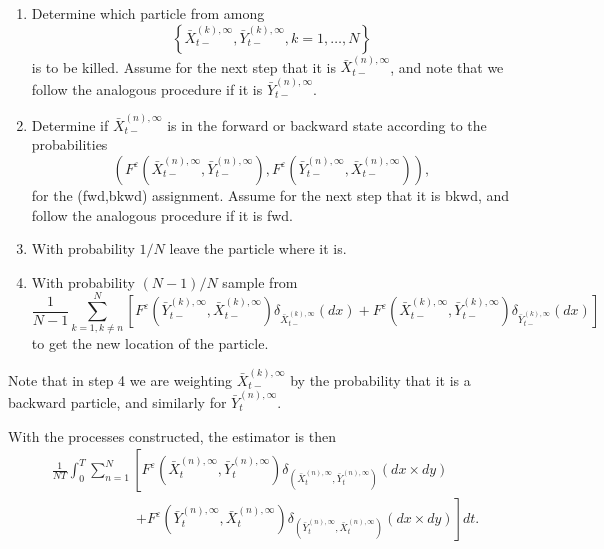 \documentclass[english,11pt]{article}%
\numberwithin{equation}{section}
\numberwithin{example}{section}
\numberwithin{theorem}{section}
\begin{document}
\begin{enumerate}
\item Determine which particle from among
\[
\left\{  \bar{X}_{t-}^{(k),\infty},\bar{Y}_{t-}^{(k),\infty},k=1,\ldots
,N\right\}
\]
is to be killed. Assume for the next step that it is $\bar{X}_{t-}%
^{(n),\infty}$, and note that we follow the analogous procedure if it is
$\bar{Y}_{t-}^{(n),\infty}$.

\item Determine if $\bar{X}_{t-}^{(n),\infty}$ is in the forward or backward
state according to the probabilities
\[
(F^{\varepsilon}(\bar{X}_{t-}^{(n),\infty},\bar{Y}_{t-}^{(n),\infty
}),F^{\varepsilon}(\bar{Y}_{t-}^{(n),\infty},\bar{X}_{t-}^{(n),\infty})),
\]
for the (fwd,bkwd) assignment. Assume for the next step that it is bkwd, and
follow the analogous procedure if it is fwd.

\item With probability $1/N$ leave the particle where it is.

\item With probability $(N-1)/N$ sample from
\[
\frac{1}{N-1}\sum_{k=1,k\neq n}^{N}\left[  F^{\varepsilon}(\bar{Y}%
_{t-}^{(k),\infty},\bar{X}_{t-}^{(k),\infty})\delta_{\bar{X}_{t-}^{(k),\infty
}}(dx)+F^{\varepsilon}(\bar{X}_{t-}^{(k),\infty},\bar{Y}_{t-}^{(k),\infty
})\delta_{\bar{Y}_{t-}^{(k),\infty}}(dx)\right]
\]
to get the new location of the particle.
\end{enumerate}

Note that in step 4 we are weighting $\bar{X}_{t-}^{(k),\infty}$ by the
probability that it is a backward particle, and similarly for $\bar{Y}%
_{t}^{(n),\infty}$.

With the processes constructed, the estimator is then%
\begin{align*}
&  \frac{1}{NT}\int_{0}^{T} \sum_{n=1}^{N} \left[  F^{\varepsilon}(\bar{X}%
_{t}^{(n),\infty},\bar{Y}_{t}^{(n),\infty})\delta_{(\bar{X}_{t}^{(n),\infty
},\bar{Y}_{t}^{(n),\infty})}(dx\times dy) \right. \\
&  \mbox{} \qquad\qquad\qquad\left.  +F^{\varepsilon}(\bar{Y}_{t}^{(n),\infty
},\bar{X}_{t}^{(n),\infty})\delta_{(\bar{Y}_{t}^{(n),\infty},\bar{X}%
_{t}^{(n),\infty})}(dx\times dy)\right]  dt. \label{eqn:infiniteN}%
\end{align*}
\end{document}
